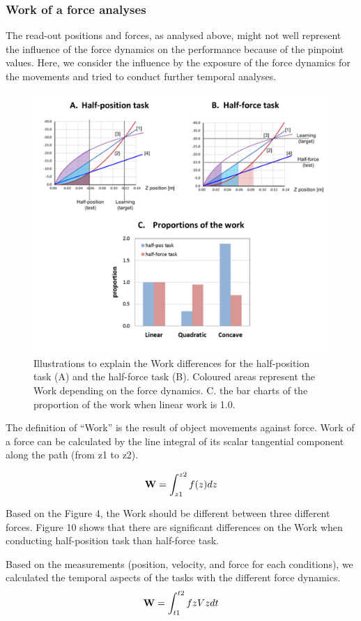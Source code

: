 \subsubsection{Work of a force analyses}
The read-out positions and forces, as analysed above, might not well represent the influence of the force dynamics on the performance because of the pinpoint values. Here, we consider the influence by the exposure of the force dynamics for the movements and tried to conduct further temporal analyses.
%
\begin{figure}
	\centering
	\includegraphics[width=.7\textwidth]{Chie/figs/Figure10.png}
	\caption{Illustrations to explain the Work differences for the half-position task (A) and the half-force task (B). Coloured areas represent the Work depending on the force dynamics. C. the bar charts of the proportion of the work when linear work is 1.0. }
	\label{work}
\end{figure}
The definition of “Work” is the result of object movements against force. Work of a force can be calculated by the line integral of its scalar tangential component along the path (from z1 to z2).

%
\begin{equation}
\mathbf{W} = \int_{z1}^{z2} f(z) dz
\end{equation}
%

Based on the Figure 4, the Work should be different between three different forces.
Figure 10 shows that there are significant differences on the Work when conducting half-position task than half-force task.

Based on the measurements (position, velocity, and force for each conditions), we calculated the temporal aspects of the tasks with the different force dynamics.
%
\begin{equation}
\mathbf{W} = \int_{t1}^{t2} fz Vz dt
\end{equation}
%

